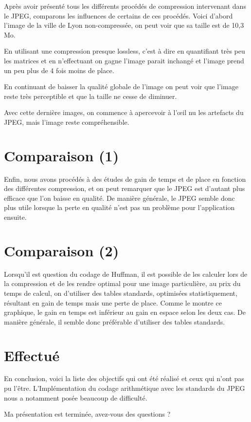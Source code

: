 \documentclass{article}
\begin{document}
Après avoir présenté tous les différents procédés de compression intervenant dans le JPEG, comparons les influences de certains de ces procédés.
Voici d'abord l'image de la ville de Lyon non-compressée, on peut voir que sa taille est de 10,3 Mo.

En utilisant une compression presque lossless, c'est à dire en quantifiant très peu les matrices et en n'effectuant
on gagne l'image parait inchangé et l'image prend un peu plus de 4 fois moins de place.

En continuant de baisser la qualité globale de l'image on peut voir que l'image reste très perceptible et que la taille ne cesse de 
diminuer. 

Avec cette dernière images, on commence à apercevoir à l'\oe il nu les artefacts du JPEG, mais l'image reste compréhensible.

\section{Comparaison (1)}

Enfin, nous avons procédés à des études de gain de temps et de place en fonction des différentes compression, et on peut remarquer
que le JPEG est d'autant plus efficace que l'on baisse en qualité. De manière générale, le JPEG semble donc plus utile lorsque la perte
en qualité n'est pas un problème pour l'application ensuite.

\section{Comparaison (2)}

Lorsqu'il est question du codage de Huffman, il est possible de les calculer lors de la compression et de les rendre optimal pour une
image particulière, au prix du temps de calcul, on d'utiliser des tables standards, optimisées statistiquement, résultant en gain de temps
mais une perte de place. Comme le montre ce graphique, le gain en temps est inférieur au gain en espace selon les deux cas. De manière générale,
il semble donc préférable d'utiliser des tables standards.

\section{Effectué}

En conclusion, voici la liste des objectifs qui ont été réalisé et ceux qui n'ont pas pu l'être. L'Implémentation du codage arithmétique
avec les standards du JPEG nous a notamment posée beaucoup de difficulté.


Ma présentation est terminée, avez-vous des questions ?
\end{document}
